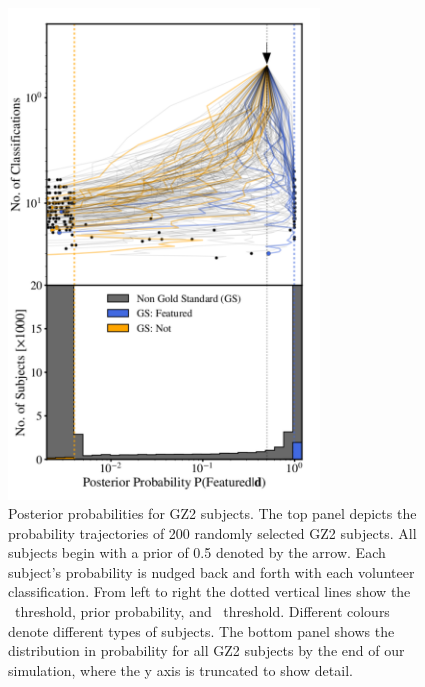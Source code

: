 \begin{figure}[t!] 
\centering
\includegraphics[width=3.25in]{Figures/human_machine/f12.pdf}
\caption[Galaxy posterior probabitilies realized through SWAP reprocessing of GZ2 data.]{Posterior probabilities for GZ2 subjects.  The top panel depicts the probability trajectories of 200 randomly selected GZ2 subjects. All subjects begin with a prior of 0.5 denoted by the arrow. Each subject's probability is nudged back and forth with each volunteer classification. From left to right the dotted vertical lines show the \notfeat~threshold, prior probability, and \feat~threshold. Different colours denote different types of subjects. The bottom panel shows the distribution in probability for all GZ2 subjects by the end of our simulation, where the y axis is truncated to show detail.  \label{fig: subject probabilities}}
\end{figure}

